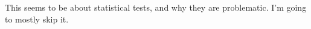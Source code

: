 This seems to be about statistical tests, and why they are problematic. I'm going to mostly skip it.


